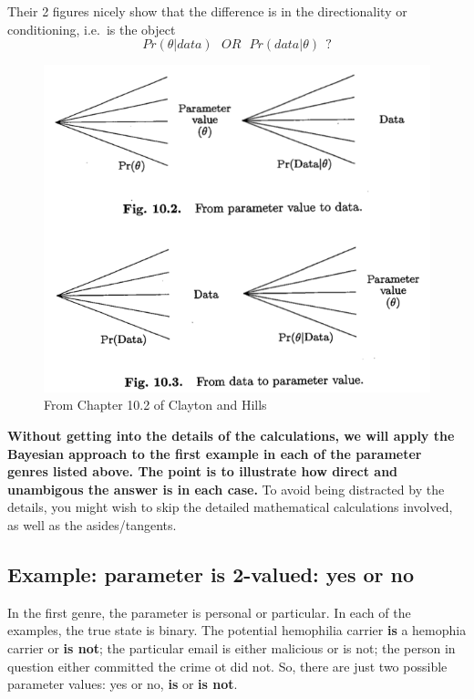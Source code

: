 \documentclass[]{book}
\begin{document}
Their 2 figures nicely show that the difference is in the directionality or conditioning, i.e.~is the object \[Pr(\theta | data) \ \ \ OR \ \ \   Pr(data | \theta) \ \ ?\]

\begin{figure}

{\centering \includegraphics[width=6.29in]{images/ClaytonHillsFig102103} 

}

\caption{From Chapter 10.2 of Clayton and Hills}\label{fig:unnamed-chunk-6}
\end{figure}

\textbf{Without getting into the details of the calculations, we will apply the Bayesian approach to the first example in each of the parameter genres listed above. The point is to illustrate how direct and unambigous the answer is in each case.} To avoid being distracted by the details, you might wish to skip the detailed mathematical calculations involved, as well as the asides/tangents.

\hypertarget{example-parameter-is-2-valued-yes-or-no}{%
\subsection{Example: parameter is 2-valued: yes or no}\label{example-parameter-is-2-valued-yes-or-no}}

In the first genre, the parameter is personal or particular. In each of the examples, the true state is binary. The potential hemophilia carrier \textbf{is} a hemophia carrier or \textbf{is not}; the particular email is either malicious or is not; the person in question either committed the crime ot did not. So, there are just two possible parameter values: yes or no, \textbf{is} or \textbf{is not}.
\end{document}
